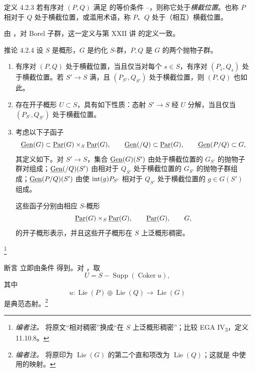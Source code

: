 \begin{sgastatement}{定义 4.2.3}
若有序对 \((P,Q)\) 满足 的等价条件 \textup{}--\textup{}，则称它处于\emph{横截位置}。也称 \(P\) 相对于 \(Q\) 处于横截位置，或滥用术语，称 \(P\)、\(Q\) 处于（相互）横截位置。
\end{sgastatement}

由 \textup{}，对 Borel 子群，这一定义与第 XXII 讲  的定义一致。

\begin{sgastatement}{推论 4.2.4}
设 \(S\) 是概形，\(G\) 是约化 \(S\)-群，\(P,Q\) 是 \(G\) 的两个抛物子群。
\begin{enumerate}[label=\textup{(\roman*)}]
\item 有序对 \((P,Q)\) 处于横截位置，当且仅当对每个 \(s\in S\)，有序对 \((P_{\bar s},Q_{\bar s})\) 处于横截位置。若 \(S'\to S\) 满，且 \((P_{S'},Q_{S'})\) 处于横截位置，则 \((P,Q)\) 也如此。
\item 存在开子概形 \(U\subset S\)，具有如下性质：态射 \(S'\to S\) 经 \(U\) 分解，当且仅当 \((P_{S'},Q_{S'})\) 处于横截位置。
\item 考虑以下子函子
\[
 \underline{\operatorname{Gen}}(G)\subset\underline{\operatorname{Par}}(G)\times_S\underline{\operatorname{Par}}(G),\qquad
 \underline{\operatorname{Gen}}(/Q)\subset\underline{\operatorname{Par}}(G),\qquad
 \underline{\operatorname{Gen}}(P/Q)\subset G,
\]
其定义如下。对 \(S'\to S\)，集合 \(\underline{\operatorname{Gen}}(G)(S')\) 由处于横截位置的 \(G_{S'}\) 的抛物子群对组成；\(\underline{\operatorname{Gen}}(/Q)(S')\) 由相对于 \(Q_{S'}\) 处于横截位置的 \(G_{S'}\) 的抛物子群组成；\(\underline{\operatorname{Gen}}(P/Q)(S')\) 由使 \(\operatorname{int}(g)P_{S'}\) 相对于 \(Q_{S'}\) 处于横截位置的 \(g\in G(S')\) 组成。

这些函子分别由相应 \(S\)-概形
\[
 \underline{\operatorname{Par}}(G)\times_S\underline{\operatorname{Par}}(G),\qquad\underline{\operatorname{Par}}(G),\qquad G,
\]
的开子概形表示，并且这些开子概形在 \(S\) 上泛概形稠密。
\end{enumerate}
\end{sgastatement}
\footnote{\emph{编者注。} 将原文“相对稠密”换成“在 \(S\) 上泛概形稠密”；比较 EGA IV\textsubscript{3}，定义 11.10.8。}

断言 \textup{} 立即由条件 \textup{} 得到。对 \textup{}，取
\[
 U=S-\operatorname{Supp}(\operatorname{Coker}u),
\]
其中
\[
 u:\operatorname{Lie}(P)\oplus\operatorname{Lie}(Q)
   \longrightarrow\operatorname{Lie}(G)
\]
是典范态射。\footnote{\emph{编者注。} 将原印为 \(\operatorname{Lie}(G)\) 的第二个直和项改为 \(\operatorname{Lie}(Q)\)；这就是\textup{} 中使用的映射。}

